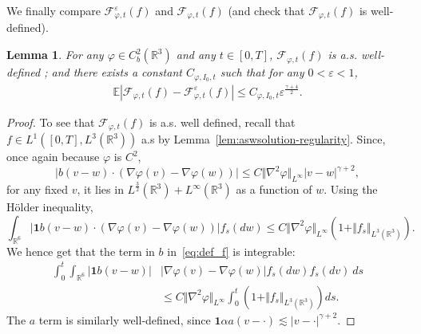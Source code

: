 \documentclass[11pt,a4paper]{article}
\theoremstyle{definition}
\theoremstyle{plain}
\newtheorem{lemma}[defi]{Lemma}
\begin{document}
We finally compare $\mathcal{F}_{\varphi,t}^\varepsilon(f)$ and $\mathcal{F}_{\varphi,t}(f)$ (and check that $\mathcal{F}_{\varphi,t}(f)$ is well-defined).
\begin{lemma}
    \label{aswsolution-feps f limit}
    For any $\varphi\in C^2_b(\mathbb{R}^3)$ and any $t\in[0,T]$, $\mathcal{F}_{\varphi,t}(f)$ is a.s. well-defined ; and there exists a constant $C_{\varphi,I_0,t}$ such that for any $0<\varepsilon<1$,
    \begin{align*}
        \mathbb{E} \left\vert\mathcal{F}_{\varphi,t}(f)-\mathcal{F}^\varepsilon_{\varphi,t}(f) \right\vert \leq C_{\varphi,I_0,t} \varepsilon^{\frac{\gamma+4}{2}}.
    \end{align*} 
\end{lemma}
\begin{proof}
    To see that $\mathcal{F}_{\varphi,t}(f)$ is a.s. well defined, recall that $f\in L^1([0,T],L^3(\mathbb{R}^3))$ a.s by Lemma~\ref{lem:aswsolution-regularity}. Since, once again because $\varphi$ is $C^2$,
    $$\vert b(v-w) \cdot (\nabla\varphi(v)-\nabla\varphi(w))\vert \leq C\Vert \nabla^2\varphi \Vert_{L^\infty}\vert v-w\vert^{\gamma+2},$$
    for any fixed $v$, it lies in $L^{\frac{3}{2}}(\mathbb{R}^3)+L^{\infty}(\mathbb{R}^3)$ as a function of $w$. Using the Hölder inequality,
    $$\int_{\mathbb{R}^6} \vert \mathbf{1} b(v-w) \cdot (\nabla\varphi(v)-\nabla\varphi(w))\vert f_s(dw) \leq C\Vert \nabla^2\varphi \Vert_{L^\infty}(1+ \Vert f_s\Vert_{L^3(\mathbb{R}^3)}).$$
    We hence get that the term in $b$ in~\eqref{eq:def_f} is integrable:
    \begin{align}
    \label{eq:defintegraltermwsol}
        \int_0^t \int_{\mathbb{R}^6} \vert \mathbf{1}b(v-w) \vert &\vert \nabla\varphi(v)-\nabla\varphi(w)\vert f_s(dw)  f_s(dv)\ ds\\
        &\leq C \Vert \nabla^2\varphi \Vert_{L^\infty}\int_0^t \left(1+ \Vert f_s\Vert_{L^3(\mathbb{R}^3)}\right)ds.\nonumber
    \end{align}
    The $a$ term is similarly well-defined, since $\mathbf{1}\alpha a (v-\cdot) \lesssim \vert v-\cdot\vert^{\gamma+2}$.
    

\end{proof}
\end{document}
